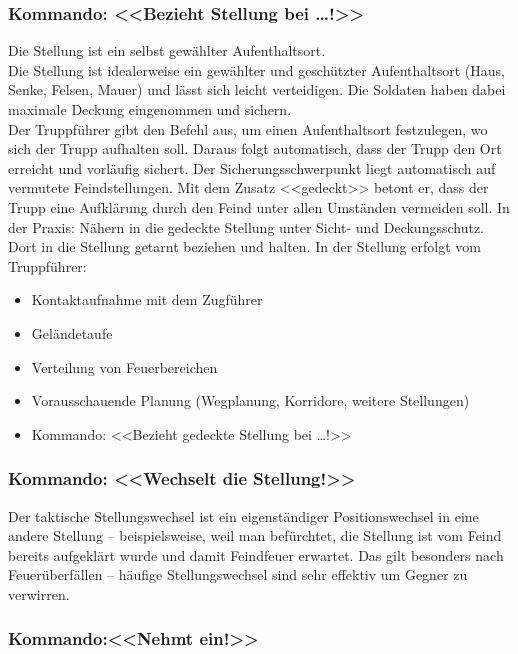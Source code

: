 \subsubsection{Kommando: <<Bezieht Stellung bei …!>>}

	Die Stellung ist ein selbst gewählter Aufenthaltsort. \\

	Die Stellung ist idealerweise ein gewählter und geschützter Aufenthaltsort (Haus, Senke, Felsen, Mauer) und lässt sich leicht verteidigen. Die Soldaten haben dabei maximale Deckung eingenommen und sichern. \\

	Der Truppführer gibt den Befehl aus, um einen Aufenthaltsort festzulegen, wo sich der Trupp aufhalten soll. Daraus folgt automatisch, dass der Trupp den Ort erreicht und vorläufig sichert. Der Sicherungsschwerpunkt liegt automatisch auf vermutete Feindstellungen. Mit dem Zusatz <<gedeckt>> betont er, dass der 		Trupp eine Aufklärung durch den Feind unter allen Umständen vermeiden soll. In der Praxis: Nähern in die gedeckte Stellung unter Sicht- und Deckungsschutz. Dort in die Stellung getarnt beziehen und halten. In der Stellung erfolgt vom Truppführer:
		\begin{itemize}
			\item Kontaktaufnahme mit dem Zugführer 
			\item Geländetaufe 
			\item Verteilung von Feuerbereichen 
			\item Vorausschauende Planung (Wegplanung, Korridore, weitere Stellungen) 
			\item Kommando: <<Bezieht gedeckte Stellung bei …!>> 
		\end{itemize}

\subsubsection{Kommando: <<Wechselt die Stellung!>>}

	Der taktische Stellungswechsel ist ein eigenständiger Positionswechsel in eine andere Stellung – beispielsweise, weil man befürchtet, die Stellung ist vom Feind bereits aufgeklärt wurde und damit Feindfeuer erwartet. Das gilt besonders nach Feuerüberfällen – häufige Stellungswechsel sind sehr effektiv um Gegner zu verwirren. \\

\subsubsection{Kommando:<<Nehmt ein!>>}


